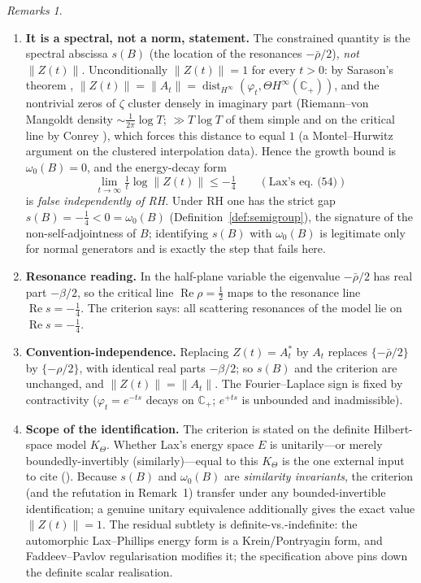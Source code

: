 \documentclass[11pt]{amsart}
\theoremstyle{plain}
\theoremstyle{definition}
\theoremstyle{remark}
\newtheorem*{remarks}{Remarks}
\newcommand{\Cp}{\mathbb{C}_{+}}
\newcommand{\Hi}{H^{\infty}(\Cp)}
\newcommand{\Kt}{K_{\Theta}}
\newcommand{\norm}[1]{\lVert #1 \rVert}
\renewcommand{\Re}{\operatorname{Re}}
\begin{document}
\begin{remarks}
\begin{enumerate}[leftmargin=1.6em]
\item \textbf{It is a spectral, not a norm, statement.} The constrained quantity is the
spectral abscissa $s(B)$ (the location of the resonances $-\bar\rho/2$), \emph{not}
$\norm{Z(t)}$. Unconditionally $\norm{Z(t)}=1$ for every $t>0$: by
Sarason's theorem \cite{sarason}, $\norm{Z(t)}=\norm{A_{t}}
=\operatorname{dist}_{H^{\infty}}(\varphi_{t},\Theta\Hi)$, and the nontrivial zeros of
$\zeta$ cluster densely in imaginary part (Riemann--von Mangoldt density
$\sim\tfrac{1}{2\pi}\log T$; $\gg T\log T$ of them simple and on the critical line by
Conrey \cite{conrey}), which forces this distance to equal $1$ (a Montel--Hurwitz
argument on the clustered interpolation data). Hence the growth bound is
$\omega_{0}(B)=0$, and the energy-decay form
\[
  \lim_{t\to\infty}\tfrac1t\log\norm{Z(t)}\le-\tfrac14\qquad(\text{Lax's eq.~(54)})
\]
is \emph{false independently of RH}. Under RH one has the strict gap
$s(B)=-\tfrac14<0=\omega_{0}(B)$ (Definition~\ref{def:semigroup}), the signature of the
non-self-adjointness of $B$; identifying $s(B)$ with $\omega_{0}(B)$ is legitimate only
for normal generators and is exactly the step that fails here.

\item \textbf{Resonance reading.} In the half-plane variable the eigenvalue $-\bar\rho/2$
has real part $-\beta/2$, so the critical line $\Re\rho=\tfrac12$ maps to the resonance
line $\Re s=-\tfrac14$. The criterion says: all scattering resonances of the model lie on
$\Re s=-\tfrac14$.

\item \textbf{Convention-independence.} Replacing $Z(t)=A_{t}^{*}$ by $A_{t}$ replaces
$\{-\bar\rho/2\}$ by $\{-\rho/2\}$, with identical real parts $-\beta/2$; so $s(B)$ and
the criterion are unchanged, and $\norm{Z(t)}=\norm{A_{t}}$. The Fourier--Laplace sign is
fixed by contractivity ($\varphi_{t}=e^{-ts}$ decays on $\Cp$; $e^{+ts}$ is unbounded and
inadmissible).

\item \textbf{Scope of the identification.} The criterion is stated on the definite
Hilbert-space model $\Kt$. Whether Lax's energy space $E$ is unitarily---or merely
boundedly-invertibly (similarly)---equal to this $\Kt$ is the one external input to cite
(\cite{uetake}). Because $s(B)$ and $\omega_{0}(B)$ are \emph{similarity invariants}, the
criterion (and the refutation in Remark~1) transfer under any bounded-invertible
identification; a genuine unitary equivalence additionally gives the exact value
$\norm{Z(t)}=1$. The residual subtlety is definite-vs.-indefinite: the automorphic
Lax--Phillips energy form is a Krein/Pontryagin form, and Faddeev--Pavlov regularisation
modifies it; the specification above pins down the definite scalar realisation.
\end{enumerate}
\end{remarks}
\end{document}
